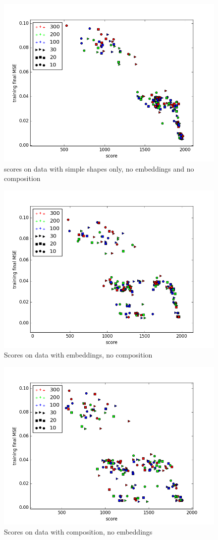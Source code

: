 \begin{description}
\begin{description}
\begin{figure}
\centering
\includegraphics[width=.8\linewidth]{ext/figure_simples_arch.png}
\caption{scores on data with simple shapes only, no embeddings and no composition}
\label{fig:simples_arch}
\end{figure}

\begin{figure}
\centering
\includegraphics[width=.8\linewidth]{ext/figure_embed_arch.png}
\caption{Scores on data with embeddings, no composition}
\label{fig:embed_arch}
\end{figure}

\begin{figure}
\centering
\includegraphics[width=.8\linewidth]{ext/figure_comp_arch.png}
\caption{Scores on data with composition, no embeddings}
\label{fig:comp_arch}
\end{figure}


\end{description}
\end{description}
